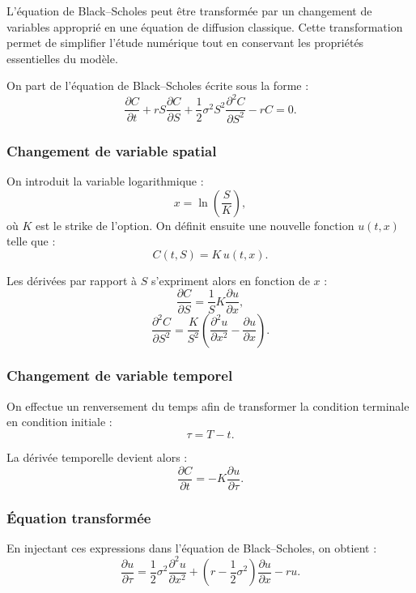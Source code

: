 \documentclass[12pt,a4paper]{article}
\begin{document}
L’équation de Black--Scholes peut être transformée par un changement de variables
approprié en une équation de diffusion classique. Cette transformation permet de
simplifier l’étude numérique tout en conservant les propriétés essentielles du
modèle.

On part de l’équation de Black--Scholes écrite sous la forme :
\begin{equation}
\frac{\partial C}{\partial t}
+ rS \frac{\partial C}{\partial S}
+ \frac{1}{2}\sigma^2 S^2 \frac{\partial^2 C}{\partial S^2}
- rC = 0.
\end{equation}

\subsubsection*{Changement de variable spatial}

On introduit la variable logarithmique :
\[
x = \ln\left(\frac{S}{K}\right),
\]
où \(K\) est le strike de l’option. On définit ensuite une nouvelle fonction
\(u(t,x)\) telle que :
\[
C(t,S) = K \, u(t,x).
\]

Les dérivées par rapport à \(S\) s’expriment alors en fonction de \(x\) :
\[
\frac{\partial C}{\partial S}
= \frac{1}{S} K \frac{\partial u}{\partial x},
\]
\[
\frac{\partial^2 C}{\partial S^2}
= \frac{K}{S^2}
\left(
\frac{\partial^2 u}{\partial x^2}
- \frac{\partial u}{\partial x}
\right).
\]

\subsubsection*{Changement de variable temporel}

On effectue un renversement du temps afin de transformer la condition terminale en
condition initiale :
\[
\tau = T - t.
\]

La dérivée temporelle devient alors :
\[
\frac{\partial C}{\partial t}
= -K \frac{\partial u}{\partial \tau}.
\]

\subsubsection*{Équation transformée}

En injectant ces expressions dans l’équation de Black--Scholes, on obtient :
\begin{equation}
\frac{\partial u}{\partial \tau}
=
\frac{1}{2}\sigma^2
\frac{\partial^2 u}{\partial x^2}
+
\left(
r - \frac{1}{2}\sigma^2
\right)
\frac{\partial u}{\partial x}
-
r u.
\end{equation}
\end{document}
